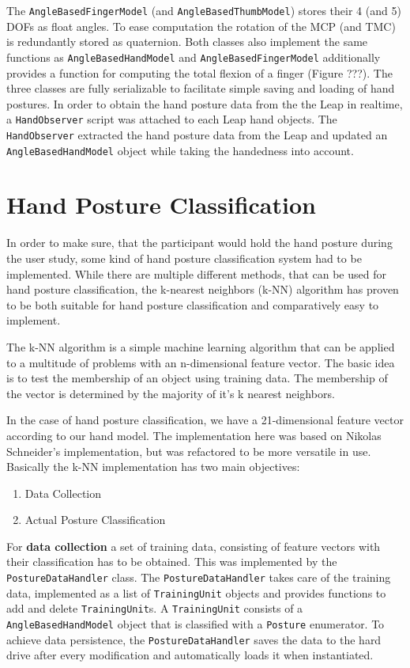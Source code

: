 The \texttt{AngleBasedFingerModel} (and \texttt{AngleBasedThumbModel}) stores their 4 (and 5) DOFs as float angles. To ease computation the rotation of the MCP (and TMC) is redundantly stored as quaternion. Both classes also implement the same functions as \texttt{AngleBasedHandModel} and \texttt{AngleBasedFingerModel} additionally provides a function for computing the total flexion of a finger (\textcolor[rgb]{1,0,0}{Figure ???}). The three classes are fully serializable to facilitate simple saving and loading of hand postures.
In order to obtain the hand posture data from the the Leap in realtime, a \texttt{HandObserver} script was attached to each Leap hand objects. The \texttt{HandObserver} extracted the hand posture data from the Leap and updated an \texttt{AngleBasedHandModel} object while taking the handedness into account.

\section{Hand Posture Classification}

In order to make sure, that the participant would hold the hand posture during the user study, some kind of hand posture classification system had to be implemented. While there are multiple different methods, that can be used for hand posture classification, the k-nearest neighbors (k-NN) algorithm has proven to be both suitable for hand posture classification and comparatively easy to implement. 

The k-NN algorithm is a simple machine learning algorithm that can be applied to a multitude of problems with an n-dimensional feature vector. The basic idea is to test the membership of an object using training data. The membership of the vector is determined by the majority of it's k nearest neighbors. 

In the case of hand posture classification, we have a 21-dimensional feature vector according to our hand model. The implementation here was based on Nikolas Schneider's implementation, but was refactored to be more versatile in use. Basically the k-NN implementation has two main objectives:

\begin{enumerate}
	\item Data Collection
	\item Actual Posture Classification
\end{enumerate}

For \textbf{data collection} a set of training data, consisting of feature vectors with their classification has to be obtained. This was implemented by the \texttt{PostureDataHandler} class. The \texttt{PostureDataHandler} takes care of the training data, implemented as a list of \texttt{TrainingUnit} objects and provides functions to add and delete \texttt{TrainingUnit}s. A \texttt{TrainingUnit} consists of a \texttt{AngleBasedHandModel} object that is classified with a \texttt{Posture} enumerator. To achieve data persistence, the \texttt{PostureDataHandler} saves the data to the hard drive after every modification and automatically loads it when instantiated.

